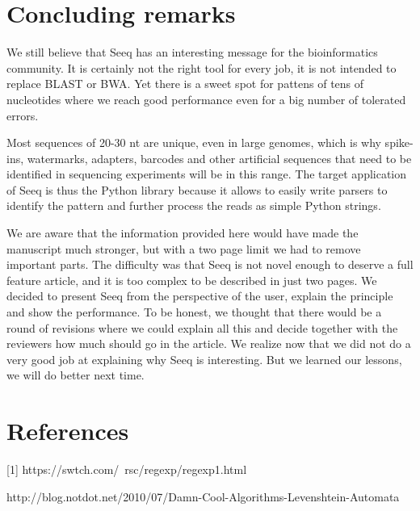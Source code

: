 \documentclass[12pt]{article}
\begin{document}
\section{Concluding remarks}

We still believe that Seeq has an interesting message for the
bioinformatics community. It is certainly not the right tool for
every job, it is not intended to replace BLAST or BWA. Yet there
is a sweet spot for pattens of tens of nucleotides where we
reach good performance even for a big number of tolerated errors.

Most sequences of 20-30 nt are unique, even in large genomes,
which is why spike-ins, watermarks, adapters, barcodes and
other artificial sequences that need to be identified in sequencing
experiments will be in this range. The target application of 
Seeq is thus the Python library because it allows to easily write
parsers to identify the pattern and further process the reads as
simple Python strings.

We are aware that the information provided here would have made
the manuscript much stronger, but with a two page limit we had to
remove important parts. The difficulty was that Seeq is not novel
enough to deserve a full feature article, and it is too complex
to be described in just two pages.
We decided to present Seeq from the
perspective of the user, explain the principle and show the
performance. To be honest, we thought that there would be a
round of revisions where we could explain all this and decide
together with the reviewers how much should go in the article.
We realize now that we did not do a very good job at explaining
why Seeq is interesting. But we learned our lessons, we will do
better next time.

\section{References}

[1] https://swtch.com/~rsc/regexp/regexp1.html
\par\noindent
[2] http://blog.notdot.net/2010/07/Damn-Cool-Algorithms-Levenshtein-Automata
\end{document}

